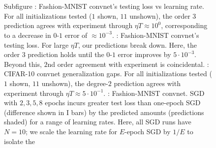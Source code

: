         \begin{figure}[h!]
            \centering  
            \\
            \\
            \caption{
                Subfigure {\!\!\protect{}}: 
                Fashion-MNIST convnet's testing loss vs learning rate.
                For all initializations tested ($1$
                shown, $11$ unshown), the order $3$ prediction agrees with
                experiment through $\eta T \approx 10^0$, corresponding to
                a decrease in $0\mbox{-}1$ error of $\approx 10^{-3}$.
                \protect{}:
                Fashion-MNIST convnet's testing loss.
                For large $\eta T$, our predictions
                break down.  Here, the order $3$ prediction holds until the
                $0\mbox{-}1$ error improves by $5\cdot 10^{-3}$.  Beyond
                this, $2$nd order agreement with experiment is
                coincidental.  
                \protect{}: CIFAR-10 convnet generalization gaps.  For all
                initializations tested ($1$ shown, $11$ unshown), the degree-$2$
                prediction agrees with experiment through $\eta T \approx
                5\cdot 10^{-1}$.
                \protect{}: 
                Fashion-MNIST convnet.  SGD with $2, 3, 5, 8$ epochs incurs
                greater test loss than one-epoch SGD (difference shown in I
                bars) by the predicted amounts (predictions shaded) for a range
                of learning rates.  Here, all SGD runs have $N=10$; we scale
                the learning rate for $E$-epoch SGD by $1/E$ to isolate the
}
\end{figure}
